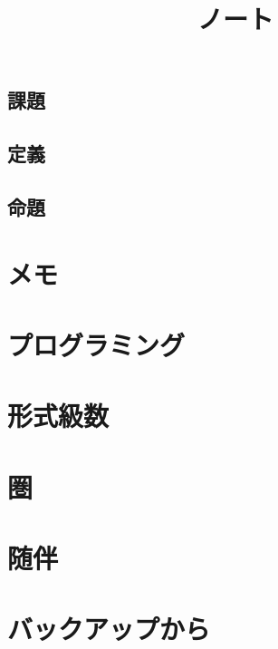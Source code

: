 \documentclass[5pt]{jreport}
\title{ノート}
\author{}
\begin{document}
\maketitle
\tableofcontents
\section*{課題}
\section*{定義}
\section*{命題}

\chapter{メモ}

\chapter{プログラミング}


\chapter{形式級数}

\chapter{圏}

\chapter{随伴}

\chapter{バックアップから}




\end{document}
